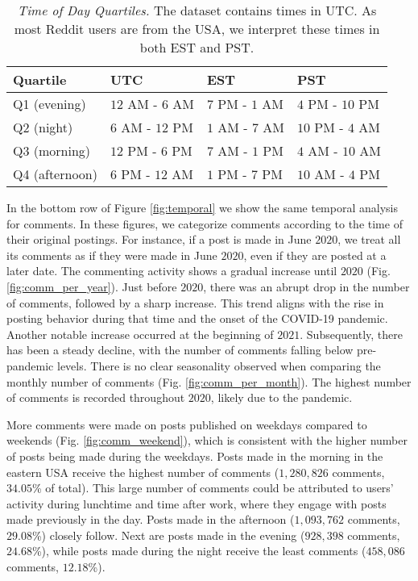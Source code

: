 \begin{table}[b]
\centering
\caption{\textit{Time of Day Quartiles.} The dataset contains times in UTC. As most Reddit users are from the USA, we interpret these times in both EST and PST.}
\begin{tabular}{@{}l l l l@{}}
\toprule
Quartile & UTC              & EST              & PST              \\ \midrule
Q1 (evening) & $12$ AM - $6$ AM  & $7$ PM - $1$ AM & $4$ PM - $10$ PM \\
Q2 (night)   & $6$ AM - $12$ PM  & $1$ AM - $7$ AM & $10$ PM - $4$ AM \\
Q3 (morning) & $12$ PM - $6$ PM & $7$ AM - $1$ PM & $4$ AM - $10$ AM \\
Q4 (afternoon) & $6$ PM - $12$ AM & $1$ PM - $7$ PM & $10$ AM - $4$ PM \\
\bottomrule
\end{tabular}
\label{table:timezones}
\end{table}

In the bottom row of Figure \ref{fig:temporal} we show the same temporal analysis for comments. In these figures, we categorize comments according to the time of their original postings. For instance, if a post is made in June $2020$, we treat all its comments as if they were made in June $2020$, even if they are posted at a later date. The commenting activity shows a gradual increase until $2020$ (Fig. \ref{fig:comm_per_year}).
Just before $2020$, there was an abrupt drop in the number of comments, followed by a sharp increase.
This trend aligns with the rise in posting behavior during that time and the onset of the COVID-19 pandemic. Another notable increase occurred at the beginning of $2021$.
Subsequently, there has been a steady decline, with the number of comments falling below pre-pandemic levels. There is no clear seasonality observed when comparing the monthly number of comments (Fig. \ref{fig:comm_per_month}).
The highest number of comments is recorded throughout $2020$, likely due to the pandemic.

More comments were made on posts published on weekdays compared to weekends (Fig. \ref{fig:comm_weekend}), which is consistent with the higher number of posts being made during the weekdays. Posts made in the morning in the eastern USA receive the highest number of comments ($1,280,826$ comments, $34.05$\% of total). This large number of comments could be attributed to users' activity during lunchtime and time after work, where they engage with posts made previously in the day.
Posts made in the afternoon ($1,093,762$ comments, $29.08$\%) closely follow. Next are posts made in the evening ($928,398$ comments, $24.68$\%), while posts made during the night receive the least comments ($458,086$ comments, $12.18$\%).



